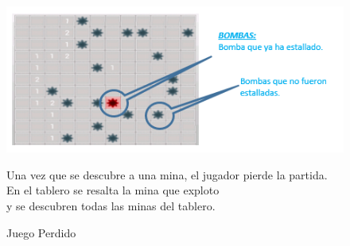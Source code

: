 \ \\ \ \\
\begin{figure}[htbp]
\begin{center}
\includegraphics[width=.70\textwidth]{./imagenes/Tabla2.png}
\caption{Juego Perdido}
\label{Juego Perdido}
\end{center}
Una vez que se descubre a una mina, el jugador pierde la partida. En el tablero se resalta la mina que exploto
\\y se descubren todas las minas del tablero.
\end{figure} 